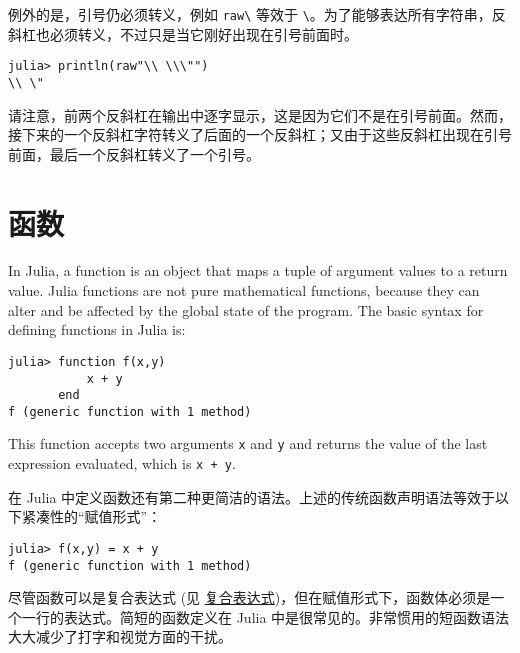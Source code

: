 例外的是，引号仍必须转义，例如 \texttt{raw{\textquotedbl}{\textbackslash}{\textquotedbl}{\textquotedbl}} 等效于 \texttt{{\textquotedbl}{\textbackslash}{\textquotedbl}{\textquotedbl}}。为了能够表达所有字符串，反斜杠也必须转义，不过只是当它刚好出现在引号前面时。




\begin{verbatim}
julia> println(raw"\\ \\\"")
\\ \"
\end{verbatim}



请注意，前两个反斜杠在输出中逐字显示，这是因为它们不是在引号前面。然而，接下来的一个反斜杠字符转义了后面的一个反斜杠；又由于这些反斜杠出现在引号前面，最后一个反斜杠转义了一个引号。



\hypertarget{11836327794581856778}{}


\chapter{函数}



In Julia, a function is an object that maps a tuple of argument values to a return value. Julia functions are not pure mathematical functions, because they can alter and be affected by the global state of the program. The basic syntax for defining functions in Julia is:




\begin{verbatim}
julia> function f(x,y)
           x + y
       end
f (generic function with 1 method)
\end{verbatim}



This function accepts two arguments \texttt{x} and \texttt{y} and returns the value of the last expression evaluated, which is \texttt{x + y}.



在 Julia 中定义函数还有第二种更简洁的语法。上述的传统函数声明语法等效于以下紧凑性的“赋值形式”：




\begin{verbatim}
julia> f(x,y) = x + y
f (generic function with 1 method)
\end{verbatim}



尽管函数可以是复合表达式 (见 \hyperlink{14178955634857450370}{复合表达式})，但在赋值形式下，函数体必须是一个一行的表达式。简短的函数定义在 Julia 中是很常见的。非常惯用的短函数语法大大减少了打字和视觉方面的干扰。



